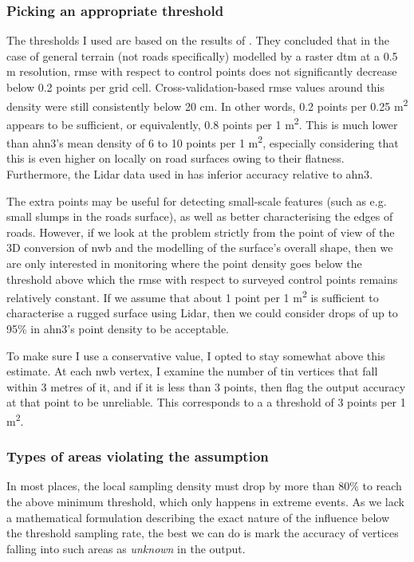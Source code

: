 \subsubsection{Picking an appropriate threshold}

The thresholds I used are based on the results of \cite{guo_etal_2010}. They concluded that in the case of general terrain (not roads specifically) modelled by a raster \ac{dtm} at a 0.5 m resolution, \ac{rmse} with respect to control points does not significantly decrease below 0.2 points per grid cell. Cross-validation-based \ac{rmse} values around this density were still consistently below 20 cm. In other words, 0.2 points per 0.25 m\textsuperscript{2} appears to be sufficient, or equivalently, 0.8 points per 1 m\textsuperscript{2}. This is much lower than \ac{ahn3}'s mean density of 6 to 10 points per 1 m\textsuperscript{2}, especially considering that this is even higher on locally on road surfaces owing to their flatness. Furthermore, the Lidar data used in \cite{guo_etal_2010} has inferior accuracy relative to \ac{ahn3}.

The extra points may be useful for detecting small-scale features (such as e.g. small slumps in the roads surface), as well as better characterising the edges of roads. However, if we look at the problem strictly from the point of view of the 3D conversion of \ac{nwb} and the modelling of the surface's overall shape, then we are only interested in monitoring where the point density goes below the threshold above which the \ac{rmse} with respect to surveyed control points remains relatively constant. If we assume that about 1 point per 1 m\textsuperscript{2} is sufficient to characterise a rugged surface using Lidar, then we could consider drops of up to 95\% in \ac{ahn3}'s point density to be acceptable.

To make sure I use a conservative value, I opted to stay somewhat above this estimate. At each \ac{nwb} vertex, I examine the number of \ac{tin} vertices that fall within 3 metres of it, and if it is less than 3 points, then flag the output accuracy at that point to be unreliable. This corresponds to a a threshold of 3 points per 1 m\textsuperscript{2}.

\subsubsection{Types of areas violating the assumption}

In most places, the local sampling density must drop by more than 80\% to reach the above minimum threshold, which only happens in extreme events. As we lack a mathematical formulation describing the exact nature of the influence below the threshold sampling rate, the best we can do is mark the accuracy of vertices falling into such areas as \textit{unknown} in the output.


